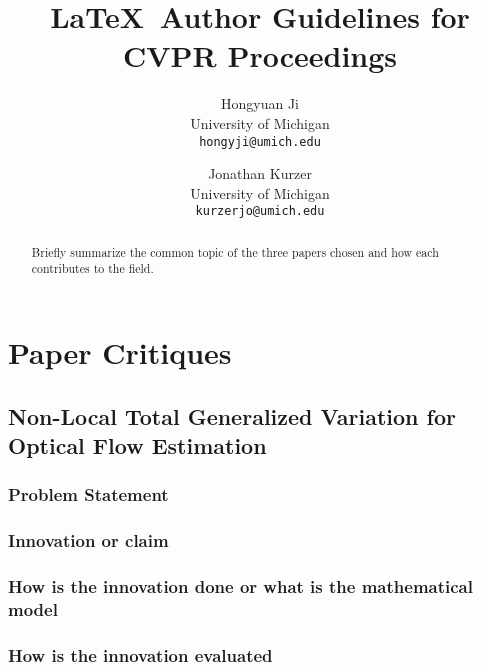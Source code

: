 \documentclass[10pt,twocolumn,letterpaper]{article}
\begin{document}
\title{\LaTeX\ Author Guidelines for CVPR Proceedings}

\author{
Hongyuan Ji\\
University of Michigan\\
{\tt\small hongyji@umich.edu}
\and
Jonathan Kurzer\\
University of Michigan\\
{\tt\small kurzerjo@umich.edu}
}

\maketitle

\begin{abstract}
   Briefly summarize the common topic of the three papers chosen and how each contributes to the field.
\end{abstract}

\section{Paper Critiques}
\lipsum[1]

\subsection{Non-Local Total Generalized Variation for Optical Flow Estimation ~\cite{ranftl2014non}}

\subsubsection{Problem Statement}
\lipsum[1]

\subsubsection{Innovation or claim}
\lipsum[1]

\subsubsection{How is the innovation done or what is the mathematical model}
\lipsum[1]

\subsubsection{How is the innovation evaluated}
\lipsum[1]
\end{document}
